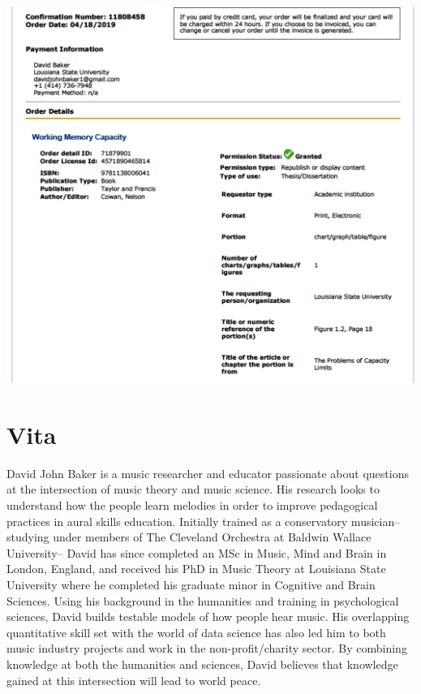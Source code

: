 \thispagestyle{empty}
\begin{center}
\includegraphics{img/cownpermission.png}
\end{center}

\chapter{Vita}

\doublespacing

David John Baker is a music researcher and educator passionate about questions at the intersection of music theory and music science.
His research looks to understand how the people learn melodies in order to improve pedagogical practices in aural skills education.
Initially trained as a conservatory musician-- studying under members of The Cleveland Orchestra at Baldwin Wallace University-- David has since completed an MSc in Music, Mind and Brain in London, England, and received his PhD in Music Theory at Louisiana State University where he completed his graduate minor in Cognitive and Brain Sciences.
Using his background in the humanities and training in psychological sciences, David builds testable models of how people hear music.
His overlapping quantitative skill set with the world of data science has also led him to both music industry projects and work in the non-profit/charity sector.
By combining knowledge at both the humanities and sciences, David believes that knowledge gained at this intersection will lead to world peace.






